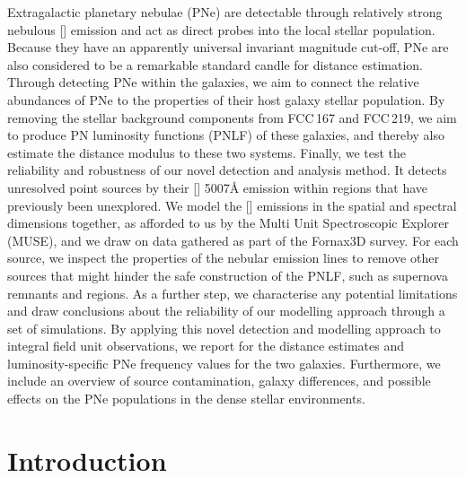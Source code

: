 \documentclass{aa}
\begin{document}
   \date{Received 07/10/2019; accepted 20/03/2020}


\abstract
{Extragalactic planetary nebulae (PNe) are detectable through relatively strong nebulous [] emission and act as direct probes into the local stellar population. Because they have an apparently universal invariant magnitude cut-off, PNe are also considered to be a remarkable standard candle for distance estimation.
   Through detecting PNe within the galaxies, we aim to connect the relative abundances of PNe to the properties of their host galaxy stellar population. By removing the stellar background components from FCC\,167 and FCC\,219, we aim to produce PN luminosity functions (PNLF) of these galaxies, and thereby also estimate the distance modulus to these two systems. Finally, we test the reliability and robustness of our novel detection and analysis method. 
   It detects unresolved point sources by their [] 5007\AA{} emission within regions that have previously been unexplored. We model the [] emissions in the spatial and spectral dimensions together, as afforded to us by the Multi Unit Spectroscopic Explorer (MUSE), and we draw on data gathered as part of the Fornax3D survey. For each source, we inspect the properties of the nebular emission lines to remove other sources that might hinder the safe construction of the PNLF, such as supernova remnants and  regions. As a further step, we characterise any potential limitations and draw conclusions about the reliability of our modelling approach through a set of simulations. By applying this novel detection and modelling approach to integral field unit observations, we report for the distance estimates and luminosity-specific PNe frequency values for the two galaxies. Furthermore, we include an overview of source contamination, galaxy differences, and possible effects on the PNe populations in the dense stellar environments.}


   \maketitle



\section{Introduction}
\end{document}
